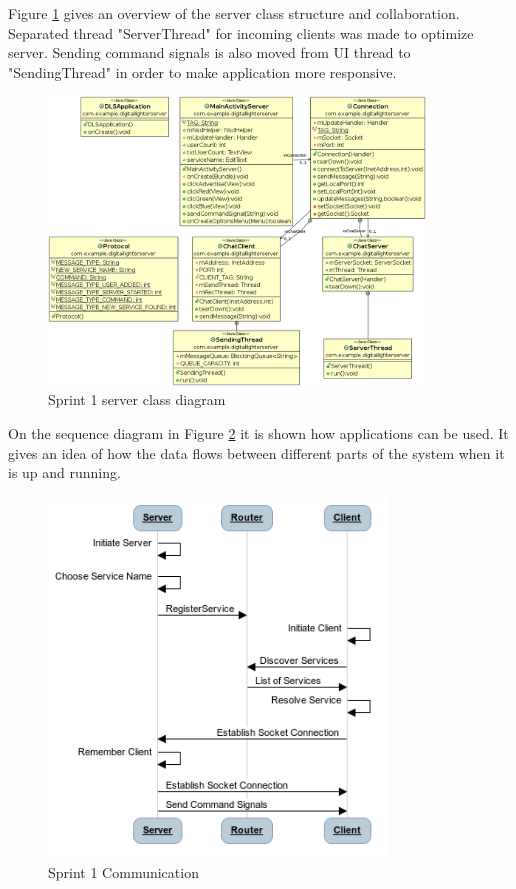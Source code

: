 Figure \ref{fig:class_diagram_server} gives an overview of the server class structure and collaboration. Separated thread "ServerThread" for incoming clients was made to optimize server. Sending command signals is also moved from UI thread to "SendingThread" in order to make application more responsive.

\begin{figure}[H]
	\centering
		\includegraphics[width=10cm]{sprint1/class_diagram_server.png}
	\caption{Sprint 1 server class diagram}
	\label{fig:class_diagram_server}
\end{figure}

On the sequence diagram in Figure \ref{fig:sprint1_communication} it is shown how applications can be used. It gives an idea of how the data flows between different parts of the system when it is up and running.

\begin{figure}[H]
	\centering
		\includegraphics[width=9cm]{sprint1/communication.png}
	\caption{Sprint 1 Communication}
	\label{fig:sprint1_communication}
\end{figure}

